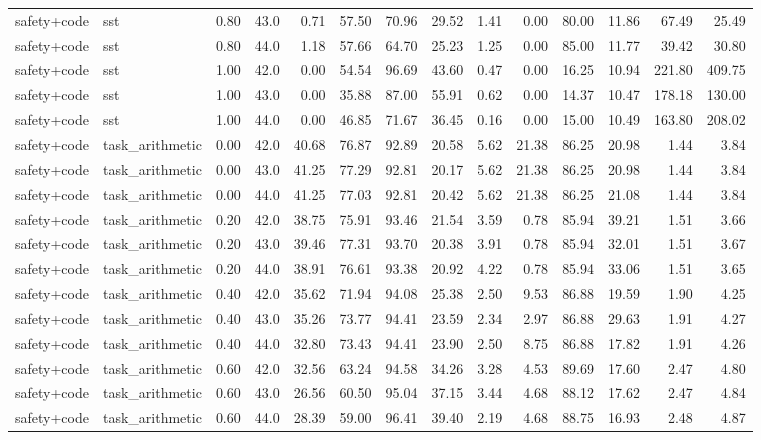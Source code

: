 \documentclass{article}
\begin{document}
\begin{table}[H]
{\begin{tabular}{llllrrrrrrrrrr}
safety+code & sst & 0.80 & 43.0 & 0.71 & 57.50 & 70.96 & 29.52 & 1.41 & 0.00 & 80.00 & 11.86 & 67.49 & 25.49 \\
safety+code & sst & 0.80 & 44.0 & 1.18 & 57.66 & 64.70 & 25.23 & 1.25 & 0.00 & 85.00 & 11.77 & 39.42 & 30.80 \\
safety+code & sst & 1.00 & 42.0 & 0.00 & 54.54 & 96.69 & 43.60 & 0.47 & 0.00 & 16.25 & 10.94 & 221.80 & 409.75 \\
safety+code & sst & 1.00 & 43.0 & 0.00 & 35.88 & 87.00 & 55.91 & 0.62 & 0.00 & 14.37 & 10.47 & 178.18 & 130.00 \\
safety+code & sst & 1.00 & 44.0 & 0.00 & 46.85 & 71.67 & 36.45 & 0.16 & 0.00 & 15.00 & 10.49 & 163.80 & 208.02 \\
safety+code & task\_arithmetic & 0.00 & 42.0 & 40.68 & 76.87 & 92.89 & 20.58 & 5.62 & 21.38 & 86.25 & 20.98 & 1.44 & 3.84 \\
safety+code & task\_arithmetic & 0.00 & 43.0 & 41.25 & 77.29 & 92.81 & 20.17 & 5.62 & 21.38 & 86.25 & 20.98 & 1.44 & 3.84 \\
safety+code & task\_arithmetic & 0.00 & 44.0 & 41.25 & 77.03 & 92.81 & 20.42 & 5.62 & 21.38 & 86.25 & 21.08 & 1.44 & 3.84 \\
safety+code & task\_arithmetic & 0.20 & 42.0 & 38.75 & 75.91 & 93.46 & 21.54 & 3.59 & 0.78 & 85.94 & 39.21 & 1.51 & 3.66 \\
safety+code & task\_arithmetic & 0.20 & 43.0 & 39.46 & 77.31 & 93.70 & 20.38 & 3.91 & 0.78 & 85.94 & 32.01 & 1.51 & 3.67 \\
safety+code & task\_arithmetic & 0.20 & 44.0 & 38.91 & 76.61 & 93.38 & 20.92 & 4.22 & 0.78 & 85.94 & 33.06 & 1.51 & 3.65 \\
safety+code & task\_arithmetic & 0.40 & 42.0 & 35.62 & 71.94 & 94.08 & 25.38 & 2.50 & 9.53 & 86.88 & 19.59 & 1.90 & 4.25 \\
safety+code & task\_arithmetic & 0.40 & 43.0 & 35.26 & 73.77 & 94.41 & 23.59 & 2.34 & 2.97 & 86.88 & 29.63 & 1.91 & 4.27 \\
safety+code & task\_arithmetic & 0.40 & 44.0 & 32.80 & 73.43 & 94.41 & 23.90 & 2.50 & 8.75 & 86.88 & 17.82 & 1.91 & 4.26 \\
safety+code & task\_arithmetic & 0.60 & 42.0 & 32.56 & 63.24 & 94.58 & 34.26 & 3.28 & 4.53 & 89.69 & 17.60 & 2.47 & 4.80 \\
safety+code & task\_arithmetic & 0.60 & 43.0 & 26.56 & 60.50 & 95.04 & 37.15 & 3.44 & 4.68 & 88.12 & 17.62 & 2.47 & 4.84 \\
safety+code & task\_arithmetic & 0.60 & 44.0 & 28.39 & 59.00 & 96.41 & 39.40 & 2.19 & 4.68 & 88.75 & 16.93 & 2.48 & 4.87 \\

\end{tabular}}
\end{table}
\end{document}

